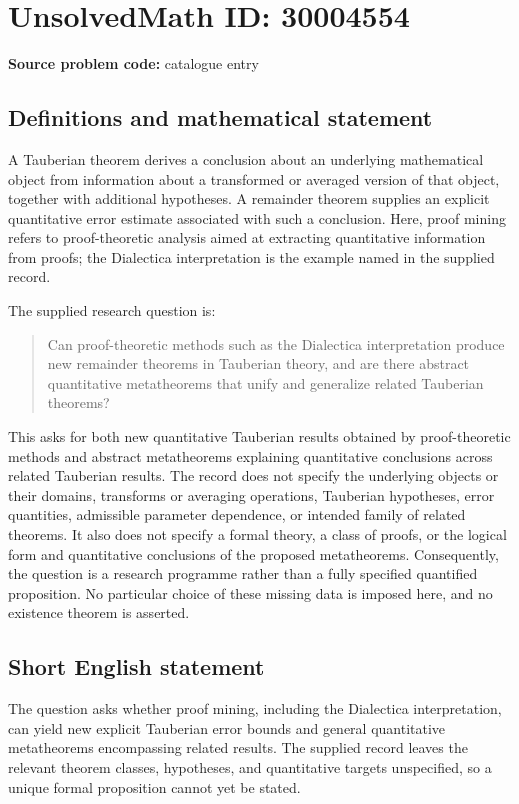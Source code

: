 \documentclass[11pt]{article}
\begin{document}
\section*{UnsolvedMath ID: 30004554}
\textbf{Source problem code:} catalogue entry
\subsection{Definitions and mathematical statement}
A Tauberian theorem derives a conclusion about an underlying mathematical object from information about a transformed or averaged version of that object, together with additional hypotheses. A remainder theorem supplies an explicit quantitative error estimate associated with such a conclusion. Here, proof mining refers to proof-theoretic analysis aimed at extracting quantitative information from proofs; the Dialectica interpretation is the example named in the supplied record.

The supplied research question is:
\begin{quote}
Can proof-theoretic methods such as the Dialectica interpretation produce new remainder theorems in Tauberian theory, and are there abstract quantitative metatheorems that unify and generalize related Tauberian theorems?
\end{quote}

This asks for both new quantitative Tauberian results obtained by proof-theoretic methods and abstract metatheorems explaining quantitative conclusions across related Tauberian results. The record does not specify the underlying objects or their domains, transforms or averaging operations, Tauberian hypotheses, error quantities, admissible parameter dependence, or intended family of related theorems. It also does not specify a formal theory, a class of proofs, or the logical form and quantitative conclusions of the proposed metatheorems. Consequently, the question is a research programme rather than a fully specified quantified proposition. No particular choice of these missing data is imposed here, and no existence theorem is asserted.
\subsection{Short English statement}
The question asks whether proof mining, including the Dialectica interpretation, can yield new explicit Tauberian error bounds and general quantitative metatheorems encompassing related results. The supplied record leaves the relevant theorem classes, hypotheses, and quantitative targets unspecified, so a unique formal proposition cannot yet be stated.
\end{document}

